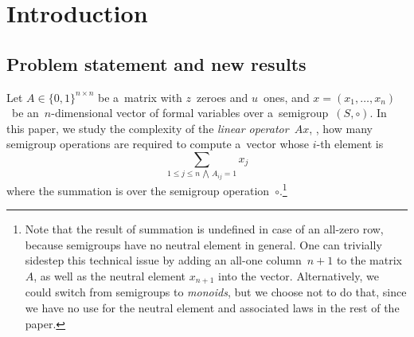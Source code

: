 

\section{Introduction}
\subsection{Problem statement and new results}
%
%

Let $A \in \{0,1\}^{n \times n}$ be a~matrix with $z$~zeroes and $u$~ones, and
$x=(x_1, \dotsc, x_n)$~be an~$n$-dimensional vector of formal variables over
a~semigroup~$(S, \circ)$. In this paper, we study the complexity of the
\emph{linear operator}~$Ax$, \ie, how many semigroup operations are required to
compute a~vector whose $i$-th element is
\begin{equation}\label{eq-problem-statement}
\sum_{1 \le j \le n\,\bigwedge\,A_{ij}=1}x_j
\end{equation}
where the summation is over the semigroup operation~$\circ$.\footnote{Note that
the result of summation is undefined in case of an all-zero row, because
semigroups have no neutral element in general. One can trivially sidestep this
technical issue by adding an all-one column~$n+1$ to the matrix~$A$, as well as
the neutral element $x_{n+1}$ into the vector. Alternatively, we could switch
from semigroups to \emph{monoids}, but we choose not to do that, since we have
no use for the neutral element and associated laws in the rest of the paper.}

